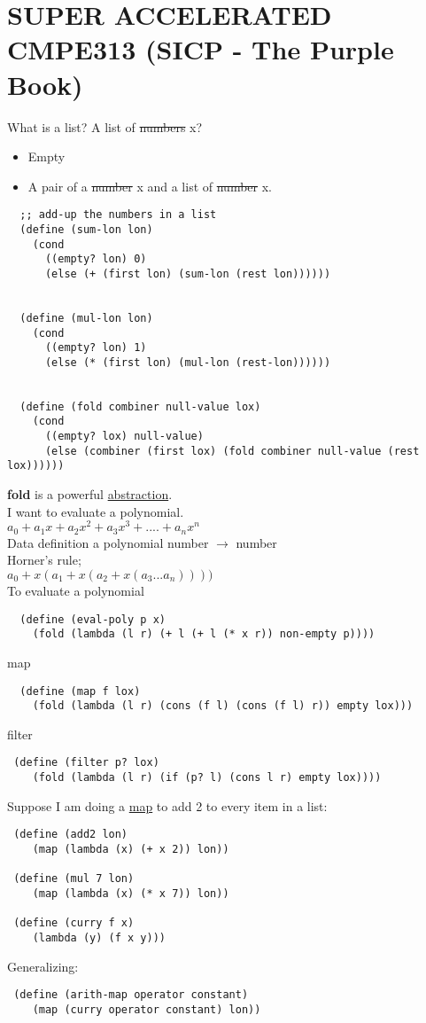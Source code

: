 \documentclass{article}
\begin{document}
\section*{SUPER ACCELERATED CMPE313 (SICP - The Purple Book)}
\begin{flushleft}
 What is a list? A list of \st{numbers} x?
 \begin{itemize}
  \item Empty
  \item A pair of a \st{number} x and a list of \st{number} x.
 \end{itemize}
 \begin{verbatim}
  ;; add-up the numbers in a list
  (define (sum-lon lon)
    (cond
      ((empty? lon) 0)
      (else (+ (first lon) (sum-lon (rest lon))))))
      

  (define (mul-lon lon)
    (cond
      ((empty? lon) 1)
      (else (* (first lon) (mul-lon (rest-lon))))))
      
      
  (define (fold combiner null-value lox)
    (cond
      ((empty? lox) null-value)
      (else (combiner (first lox) (fold combiner null-value (rest lox))))))
 \end{verbatim}
 \textbf{fold} is a powerful \underline{abstraction}.\\
 \bigskip
 I want to evaluate a polynomial.\\
 $ {a}_{0} + {a}_{1}x + {a}_{2}{x}^{2} + {a}_{3}{x}^{3} +....+ {a}_{n}{x}^{n} $ \\
 Data definition a polynomial number $\rightarrow$ number\\
 \bigskip
 Horner's rule;\\
 ${a}_{0} + x({a}_{1} + x({a}_{2} + x({a}_{3}...{a}_{n}))))$\\
 \bigskip
 To evaluate a polynomial\\
 \begin{verbatim}
  (define (eval-poly p x)
    (fold (lambda (l r) (+ l (+ l (* x r)) non-empty p))))
 \end{verbatim}
 map
 \begin{verbatim}
  (define (map f lox) 
    (fold (lambda (l r) (cons (f l) (cons (f l) r)) empty lox)))
 \end{verbatim}
\bigskip
 filter
\begin{verbatim}
 (define (filter p? lox)
    (fold (lambda (l r) (if (p? l) (cons l r) empty lox))))
\end{verbatim}
Suppose I am doing a \underline{map} to add 2 to every item in a list:
\begin{verbatim}
 (define (add2 lon)
    (map (lambda (x) (+ x 2)) lon))
    
 (define (mul 7 lon)
    (map (lambda (x) (* x 7)) lon))
    
 (define (curry f x)
    (lambda (y) (f x y)))
\end{verbatim}
Generalizing:
\begin{verbatim}
 (define (arith-map operator constant)
    (map (curry operator constant) lon))
\end{verbatim}
\end{flushleft}
\end{document}
